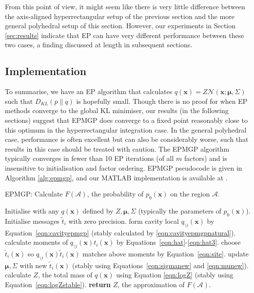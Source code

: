\documentclass[twoside,11pt]{article}
\def\x{{\mathbf x}}
\def\boldmu{\bm{\mu}}
\def\regionA{\mathcal{A}}
\newcommand{\wo}{\setminus}
\begin{document}
From this point of view, it might seem like there is very little difference between the axis-aligned hyperrectangular setup of the previous section and the more general polyhedral setup of this section.  However, our experiments in Section \ref{sec:results} indicate that EP can have very different performance between these two cases, a finding discussed at length in subsequent sections.

\subsection{Implementation}

To summarise, we have an EP algorithm that calculates $q(\x) = Z\mathcal{N}(\x; \boldmu, \Sigma)$ such that $D_{KL}(p \| q)$ is hopefully small.  Though there is no proof for when EP methods converge to the global KL minimiser, our results (in the following sections) suggest that EPMGP does converge to a fixed point reasonably close to this optimum in the hyperrectangular integration case.  In the general polyhedral case, performance is often excellent but can also be considerably worse, such that results in this case should be treated with caution.   The EPMGP algorithm typically converges in fewer than 10 EP iterations (of all $m$ factors) and is insensitive to initialisation and factor ordering.   EPMGP pseudocode is given in Algorithm \ref{alg:epmgp}, and our MATLAB implementation is available at {\tt <url to come with publication>}.
%
\begin{algorithm}
\caption{EPMGP: Calculate $F(\regionA)$, the probability of $p_0(\x)$
on the region $\regionA$.}
\label{alg:epmgp}
\begin{algorithmic}[1]
\STATE Initialise with any $q(\x)$ defined by $Z,\boldmu,\Sigma$ (typically the parameters of $p_0(\x)$).
\STATE Initialise messages $\tilde{t}_{i}$ with zero precision.
\WHILE{$q(\x)$ has not converged}
\STATE form cavity local $q_{\wo i}(\x)$ by Equation~\ref{eqn:cavityepmgp} (stably calculated by \ref{eqn:cavityepmgpnatural}).
\STATE calculate moments of $q_{\wo i}(\x)t_i(\x)$ by Equations~\ref{eqn:hat}-\ref{eqn:hat3}.
\STATE choose $\tilde{t}_i(\x)$ so $q_{\wo i}(\x)\tilde{t}_i(\x)$
matches above moments by Equation~\ref{eqn:site}.
\ENDFOR
\STATE update $\boldmu,\Sigma$ with new $\tilde{t}_i(\x)$ (stably using Equations~\ref{eqn:sigmanew} and \ref{eqn:munew}).
\ENDWHILE
\STATE calculate $Z$, the total mass of $q(\x)$ using Equation \ref{eqn:logZ} (stably using Equation~\ref{eqn:logZstable}).
\STATE \textbf{return} $Z$, the approximation of $F(\regionA)$.
\end{algorithmic}
\end{algorithm}
\end{document}
